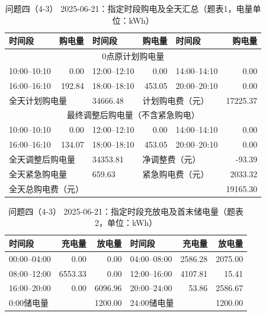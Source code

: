 \FloatBarrier
\begin{table}[H]
\centering\footnotesize
\setlength{\tabcolsep}{4pt}
\caption{问题四（4-3） 2025-06-21：指定时段购电及全天汇总（题表1，电量单位：kWh）}
\label{tab:required-q43-2025-06-21-grid}
\begin{tabular}{@{}lrlrlr@{}}
\toprule
时间段 & 购电量 & 时间段 & 购电量 & 时间段 & 购电量 \\
\midrule
\multicolumn{6}{c}{0点原计划购电量} \\
10:00--10:10 & 0.00 & 12:00--12:10 & 0.00 & 14:00--14:10 & 0.00 \\
16:00--16:10 & 192.84 & 18:00--18:10 & 453.05 & 20:00--20:10 & 0.00 \\
\multicolumn{2}{l}{全天计划购电量} & 34666.48 & \multicolumn{2}{l}{计划购电费（元）} & 17225.37 \\
\multicolumn{6}{c}{最终调整后购电量（不含紧急购电）} \\
10:00--10:10 & 0.00 & 12:00--12:10 & 0.00 & 14:00--14:10 & 0.00 \\
16:00--16:10 & 134.07 & 18:00--18:10 & 453.05 & 20:00--20:10 & 0.00 \\
\multicolumn{2}{l}{全天调整后购电量} & 34353.81 & \multicolumn{2}{l}{净调整费（元）} & -93.39 \\
\multicolumn{2}{l}{全天紧急购电量} & 659.63 & \multicolumn{2}{l}{紧急购电费（元）} & 2033.32 \\
\multicolumn{5}{l}{全天总购电费（元）} & 19165.30 \\
\bottomrule
\end{tabular}
\end{table}

\begin{table}[H]
\centering\footnotesize
\setlength{\tabcolsep}{4pt}
\caption{问题四（4-3） 2025-06-21：指定时段充放电及首末储电量（题表2，单位：kWh）}
\label{tab:required-q43-2025-06-21-storage}
\begin{tabular}{@{}lrrlrr@{}}
\toprule
时间段 & 充电量 & 放电量 & 时间段 & 充电量 & 放电量 \\
\midrule
00:00--04:00 & 0.00 & 0.00 & 04:00--08:00 & 2586.28 & 2075.00 \\
08:00--12:00 & 6553.33 & 0.00 & 12:00--16:00 & 4107.81 & 15.41 \\
16:00--20:00 & 0.00 & 6096.96 & 20:00--24:00 & 53.86 & 2586.67 \\
\multicolumn{2}{l}{0:00储电量} & 1200.00 & \multicolumn{2}{l}{24:00储电量} & 1200.00 \\
\bottomrule
\end{tabular}
\end{table}

